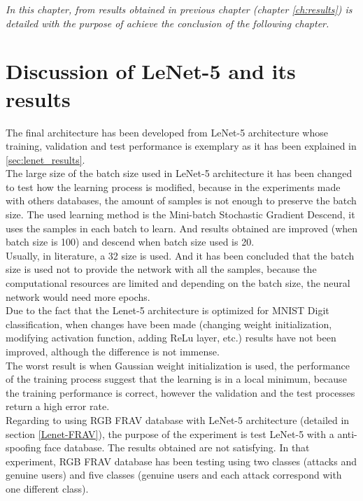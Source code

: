 \begin{small}
\emph{In this chapter, from results obtained in previous chapter (chapter \ref{ch:results}) is detailed with the purpose of achieve the conclusion of the following chapter.\\}
\end{small}

\section{Discussion of LeNet-5 and its results}
The final architecture has been developed from LeNet-5 architecture whose training, validation and test performance is exemplary as it has been explained in \ref{sec:lenet_results}.\\

The large size of the batch size used in LeNet-5 architecture it has been changed to test how the learning process is modified, because in the experiments made with others databases, the amount of samples is not enough to preserve the batch size. The used learning method is the Mini-batch Stochastic Gradient Descend, it uses the samples in each batch to learn. And results obtained are improved (when batch size is 100) and descend when batch size used is 20. \\

Usually, in literature, a 32 size is used. And it has been concluded that the batch size is used not to provide the network with all the samples, because the computational resources are limited and depending on the batch size, the neural network would need more epochs.\\

Due to the fact that the Lenet-5 architecture is optimized for MNIST Digit classification, when changes have been made (changing weight initialization, modifying activation function, adding ReLu layer, etc.) results have not been improved, although the difference is not immense.\\

The worst result is when Gaussian weight initialization is used, the performance of the training process suggest that the learning is in a local minimum, because the training performance is correct, however the validation and the test processes return a high error rate.\\

Regarding to using RGB FRAV database with LeNet-5 architecture (detailed in section \ref{Lenet-FRAV}), the purpose of the experiment is test LeNet-5 with a anti-spoofing face database. The  results obtained are not satisfying. In that experiment, RGB FRAV database has been testing using two classes (attacks and genuine users) and five classes (genuine users and each attack correspond with one different class).\\

